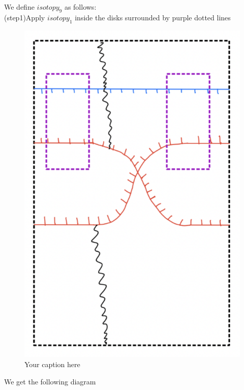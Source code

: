 We define $isotopy_9$ as follows:\\
(step1)Apply $isotopy_1$ inside the disks surrounded by purple dotted lines
\begin{figure}[H] %
    \centering
    \includegraphics[scale = 0.95]{diagrams/lemma10/3.png} %
    \caption{Your caption here}
    \label{fig:your-label}
\end{figure}

We get the following diagram

